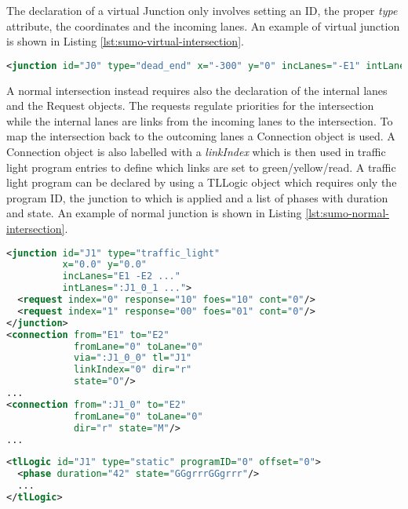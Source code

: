 The declaration of a virtual Junction only involves setting an ID, the proper \textit{type} attribute, the coordinates and the incoming lanes.
An example of virtual junction is shown in Listing \ref{lst:sumo-virtual-intersection}.

\noindent
\begin{minipage}{\linewidth}
\begin{lstlisting}[language=XML, caption=Example of virtual Intersection declaration in SUMO format, label={lst:sumo-virtual-intersection}]
<junction id="J0" type="dead_end" x="-300" y="0" incLanes="-E1" intLanes=""/>
\end{lstlisting}
\end{minipage}

A normal intersection instead requires also the declaration of the internal lanes and the Request objects.
The requests regulate priorities for the intersection while the internal lanes are links from the incoming lanes to the intersection. To map the intersection back to the outcoming lanes a Connection object is used.
A Connection object is also labelled with a \textit{linkIndex} which is then used in traffic light program entries to define which links are set to green/yellow/read.
A traffic light program can be declared by using a TLLogic object which requires only the program ID, the junction to which is applied and a list of phases with duration and state.
An example of normal junction is shown in Listing \ref{lst:sumo-normal-intersection}.

\noindent
\begin{minipage}{\linewidth}
\begin{lstlisting}[language=XML, caption=Example of normal Intersection declaration in SUMO format, label={lst:sumo-normal-intersection}]
<junction id="J1" type="traffic_light"
          x="0.0" y="0.0"
          incLanes="E1 -E2 ..."
          intLanes=":J1_0_1 ...">
  <request index="0" response="10" foes="10" cont="0"/>
  <request index="1" response="00" foes="01" cont="0"/>
</junction>
<connection from="E1" to="E2"
            fromLane="0" toLane="0"
            via=":J1_0_0" tl="J1"
            linkIndex="0" dir="r"
            state="O"/>
...
<connection from=":J1_0" to="E2"
            fromLane="0" toLane="0"
            dir="r" state="M"/>
...
\end{lstlisting}
\end{minipage}

\noindent
\begin{minipage}{\linewidth}
\begin{lstlisting}[language=XML, caption=Example of traffic light program declaration in SUMO format, label={lst:sumo-traffic-light-program}]
<tlLogic id="J1" type="static" programID="0" offset="0">
  <phase duration="42" state="GGgrrrGGgrrr"/>
  ...
</tlLogic>
\end{lstlisting}
\end{minipage}

